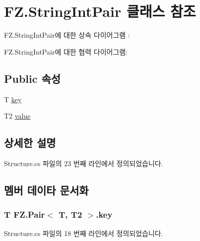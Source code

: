 \hypertarget{class_f_z_1_1_string_int_pair}{}\section{F\+Z.\+String\+Int\+Pair 클래스 참조}
\label{class_f_z_1_1_string_int_pair}


F\+Z.\+String\+Int\+Pair에 대한 상속 다이어그램 \+: 


F\+Z.\+String\+Int\+Pair에 대한 협력 다이어그램\+:
\subsection*{Public 속성}
\begin{DoxyCompactItemize}
\item 
T \hyperlink{class_f_z_1_1_pair_a36d4b7c90f0a247dff54da733701a53a}{key}
\item 
T2 \hyperlink{class_f_z_1_1_pair_a548bd4cfb4d1587016f1f53be6fac5b8}{value}
\end{DoxyCompactItemize}


\subsection{상세한 설명}


Structure.\+cs 파일의 23 번째 라인에서 정의되었습니다.



\subsection{멤버 데이타 문서화}
\subsubsection[{\texorpdfstring{key}{key}}]{\setlength{\rightskip}{0pt plus 5cm}T {\bf F\+Z.\+Pair}$<$ T, T2 $>$.key\hspace{0.3cm}{\ttfamily [inherited]}}\hypertarget{class_f_z_1_1_pair_a36d4b7c90f0a247dff54da733701a53a}{}\label{class_f_z_1_1_pair_a36d4b7c90f0a247dff54da733701a53a}


Structure.\+cs 파일의 18 번째 라인에서 정의되었습니다.

